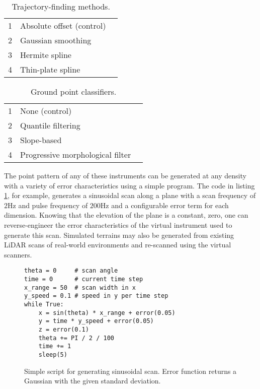 \documentclass[10pt]{report}
\begin{document}
\begin{table}
\caption{Trajectory-finding methods.}
\label{list:traj_methods}
\begin{tabular}{r | l | c}
\hline
1 & Absolute offset (control) & \\
2 & Gaussian smoothing & \cite{Alqahtani2018} \\
3 & Hermite spline &  \cite{Silvan-Cardenas2006} \\
4 & Thin-plate spline & \cite{Hudak2012} \\
\hline
\end{tabular}
\end{table}

\begin{table}
\caption{Ground point classifiers.}
\label{list:class_methods}
\begin{tabular}{r | l | c}
\hline
1 & None (control) & \\
2 & Quantile filtering & \\
3 & Slope-based & \cite{Vosselman2000} \\
4 & Progressive morphological filter & \cite{Zhang2003} \\
\hline
\end{tabular}
\end{table}


The point pattern of any of these instruments can be generated at any density with a variety of error characteristics using a simple program. The code in listing \ref{fig:scan_code}, for example, generates a sinusoidal scan along a plane with a scan frequency of $2\si{\Hz}$ and pulse frequency of $200\si{\Hz}$ and a configurable error term for each dimension. Knowing that the elevation of the plane is a constant, zero, one can reverse-engineer the error characteristics of the virtual instrument used to generate this scan. Simulated terrains may also be generated from existing LiDAR scans of real-world environments and re-scanned using the virtual scanners. 

\begin{figure}
\begin{lstlisting}
theta = 0     # scan angle
time = 0      # current time step
x_range = 50  # scan width in x
y_speed = 0.1 # speed in y per time step
while True:
	x = sin(theta) * x_range + error(0.05)
	y = time * y_speed + error(0.05)
	z = error(0.1)
	theta += PI / 2 / 100
	time += 1
	sleep(5)
\end{lstlisting}
\caption{Simple script for generating sinusoidal scan. Error function returns a Gaussian with the given standard deviation.}
\label{fig:scan_code}
\end{figure}
\end{document}
